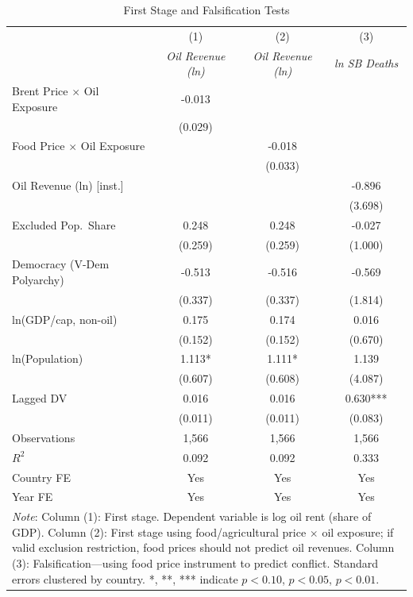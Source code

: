 \begin{table}[htbp]\centering\small
\caption{First Stage and Falsification Tests}\label{tab:firststage}
\begin{tabular}{lccc}
\toprule
 & (1) & (2) & (3) \\
 & \textit{Oil Revenue (ln)} & \textit{Oil Revenue (ln)} & \textit{ln SB Deaths} \\
\midrule
Brent Price $\times$ Oil Exposure & -0.013 &  &  \\
 & (0.029) &  &  \\
Food Price $\times$ Oil Exposure &  & -0.018 &  \\
 &  & (0.033) &  \\
Oil Revenue (ln) [inst.] &  &  & -0.896 \\
 &  &  & (3.698) \\
Excluded Pop.\ Share & 0.248 & 0.248 & -0.027 \\
 & (0.259) & (0.259) & (1.000) \\
Democracy (V-Dem Polyarchy) & -0.513 & -0.516 & -0.569 \\
 & (0.337) & (0.337) & (1.814) \\
ln(GDP/cap, non-oil) & 0.175 & 0.174 & 0.016 \\
 & (0.152) & (0.152) & (0.670) \\
ln(Population) & 1.113* & 1.111* & 1.139 \\
 & (0.607) & (0.608) & (4.087) \\
Lagged DV & 0.016 & 0.016 & 0.630*** \\
 & (0.011) & (0.011) & (0.083) \\
\midrule
Observations & 1,566 & 1,566 & 1,566 \\
$R^2$ & 0.092 & 0.092 & 0.333 \\
Country FE & Yes & Yes & Yes \\
Year FE & Yes & Yes & Yes \\
\bottomrule
\multicolumn{4}{p{0.95\linewidth}}{\footnotesize
\textit{Note}: Column (1): First stage. Dependent variable is log oil rent (share of GDP). Column (2): First stage using food/agricultural price $\times$ oil exposure; if valid exclusion restriction, food prices should not predict oil revenues. Column (3): Falsification---using food price instrument to predict conflict. Standard errors clustered by country. *, **, *** indicate $p<0.10$, $p<0.05$, $p<0.01$.}
\end{tabular}
\end{table}